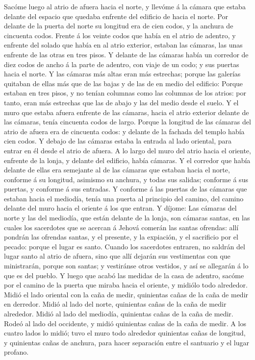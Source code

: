  Sacóme luego al atrio de afuera hacia el norte, y llevóme
á la cámara que estaba delante del espacio que quedaba enfrente del
edificio de hacia el norte.  Por delante de la puerta del
norte su longitud era de cien codos, y la anchura de cincuenta codos.
 Frente á los veinte codos que había en el atrio de
adentro, y enfrente del solado que había en al atrio exterior, estaban
las cámaras, las unas enfrente de las otras en tres pisos.
 Y delante de las cámaras había un corredor de diez codos
de ancho á la parte de adentro, con viaje de un codo; y sus puertas
hacia el norte.  Y las cámaras más altas eran más
estrechas; porque las galerías quitaban de ellas más que de las bajas y
de las de en medio del edificio:  Porque estaban en tres
pisos, y no tenían columnas como las columnas de los atrios: por tanto,
eran más estrechas que las de abajo y las del medio desde el suelo.
 Y el muro que estaba afuera enfrente de las cámaras,
hacia el atrio exterior delante de las cámaras, tenía cincuenta codos de
largo.  Porque la longitud de las cámaras del atrio de
afuera era de cincuenta codos: y delante de la fachada del templo había
cien codos.  Y debajo de las cámaras estaba la entrada al
lado oriental, para entrar en él desde el atrio de afuera.
 A lo largo del muro del atrio hacia el oriente, enfrente
de la lonja, y delante del edificio, había cámaras.  Y el
corredor que había delante de ellas era semejante al de las cámaras que
estaban hacia el norte, conforme á su longitud, asimismo su anchura, y
todas sus salidas; conforme á sus puertas, y conforme á sus entradas.
 Y conforme á las puertas de las cámaras que estaban
hacia el mediodía, tenía una puerta al principio del camino, del camino
delante del muro hacia el oriente á los que entran.  Y
díjome: Las cámaras del norte y las del mediodía, que están delante de
la lonja, son cámaras santas, en las cuales los sacerdotes que se
acercan á Jehová comerán las santas ofrendas: allí pondrán las ofrendas
santas, y el presente, y la expiación, y el sacrificio por el pecado:
porque el lugar es santo.  Cuando los sacerdotes
entraren, no saldrán del lugar santo al atrio de afuera, sino que allí
dejarán sus vestimentas con que ministrarán, porque son santas; y
vestiránse otros vestidos, y así se allegarán á lo que es del pueblo.
 Y luego que acabó las medidas de la casa de adentro,
sacóme por el camino de la puerta que miraba hacia el oriente, y midiólo
todo alrededor.  Midió el lado oriental con la caña de
medir, quinientas cañas de la caña de medir en derredor. 
Midió al lado del norte, quinientas cañas de la caña de medir alrededor.
 Midió al lado del mediodía, quinientas cañas de la caña
de medir.  Rodeó al lado del occidente, y midió
quinientas cañas de la caña de medir.  A los cuatro lados
lo midió; tuvo el muro todo alrededor quinientas cañas de longitud, y
quinientas cañas de anchura, para hacer separación entre el santuario y
el lugar profano.

